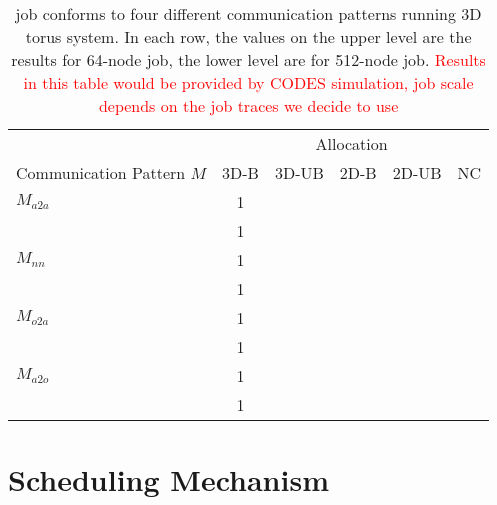 \documentclass[conference]{IEEEtran}
\begin{document}
\begin{table}[ht]
\begin{center}
\caption{job conforms to four different communication patterns running 3D torus system. In each row, the values on the upper level are the results for 64-node job, the lower level are for 512-node job.
\textcolor{red}{Results in this table would be provided by CODES simulation, job scale depends on the job traces we decide to use}} 
\label{tab: 64/512node-job}
\begin{tabular}{l c c c c c} 
\toprule %
\toprule
&\multicolumn{5}{c}{Allocation} \\
\cmidrule(l){2-6}
Communication Pattern $M$ & 3D-B & 3D-UB & 2D-B & 2D-UB & NC \\ %

\midrule %
$M_{a2a}$   & 1  &   &    &   &  \\ %
           & 1  &   &    &   &  \\ %
\midrule
$M_{nn}$  & 1  &   &    &   &  \\ %
            & 1  &   &    &   &   \\ %
\midrule
$M_{o2a}$   & 1  &   &    &   &  \\ %
            & 1  &   &    &   & \\ %
\midrule
$M_{a2o}$    & 1  &   &    &   & \\ %
             & 1  &   &    &   &  \\ %
\midrule
\bottomrule %
\end{tabular}
\end{center}
\end{table}



\section{Scheduling Mechanism}
\label{sec:scheduling mechanism}
\end{document}
